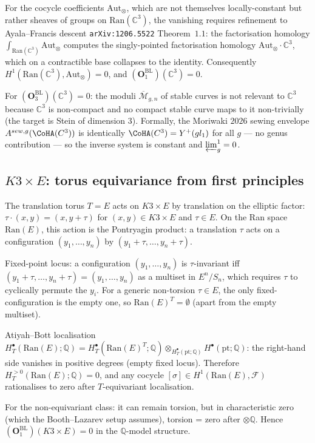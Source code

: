 \documentclass[11pt]{amsart}
\newcommand{\cF}{\mathcal{F}}
\newcommand{\Ran}{\mathrm{Ran}}
\newcommand{\Mbar}{\overline{\mathcal{M}}}
\newcommand{\bC}{\mathbb{C}}
\newcommand{\bQ}{\mathbb{Q}}
\newcommand{\Aut}{\mathrm{Aut}}
\begin{document}
For the cocycle coefficients $\Aut_\otimes$, which are not
themselves locally-constant but rather sheaves of groups on
$\Ran(\bC^3)$, the vanishing requires refinement to Ayala--Francis
descent \texttt{arXiv:1206.5522} Theorem~$1.1$: the factorisation
homology $\int_{\Ran(\bC^3)} \Aut_\otimes$ computes the
singly-pointed factorisation homology $\Aut_\otimes \cdot \bC^3$,
which on a contractible base collapses to the identity.
Consequently $H^1(\Ran(\bC^3), \Aut_\otimes) = 0$, and
$(\mathbf{O}_1^{\mathrm{BL}})(\bC^3) = 0$.

For $(\mathbf{O}_3^{\mathrm{BL}})(\bC^3) = 0$: the moduli
$\Mbar_{g, n}$ of stable curves is not relevant to $\bC^3$ because
$\bC^3$ is non-compact and no compact stable curve
maps to it non-trivially (the target is Stein of dimension $3$).
Formally, the Moriwaki $2026$ sewing envelope
$A^{\mathrm{sew}, g}(\CoHA(\bC^3))$ is identically
$\CoHA(\bC^3) = Y^+(\widehat{\mathfrak{gl}}_1)$ for all $g$ --- no
genus contribution --- so the inverse system is constant and
$\varprojlim^1_g = 0$.

\subsection{$K3 \times E$: torus equivariance from first principles}

The translation torus $T = E$ acts on $K3 \times E$ by translation
on the elliptic factor: $\tau \cdot (x, y) = (x, y + \tau)$ for
$(x, y) \in K3 \times E$ and $\tau \in E$. On the Ran space
$\Ran(E)$, this action is the Pontryagin product: a translation
$\tau$ acts on a configuration $(y_1, \dots, y_n)$ by
$(y_1 + \tau, \dots, y_n + \tau)$.

Fixed-point locus: a configuration $(y_1, \dots, y_n)$ is
$\tau$-invariant iff $(y_1 + \tau, \dots, y_n + \tau) =
(y_1, \dots, y_n)$ as a multiset in $E^n/S_n$, which requires
$\tau$ to cyclically permute the $y_i$. For a generic
non-torsion $\tau \in E$, the only fixed-configuration is the empty
one, so $\Ran(E)^T = \emptyset$ (apart from the empty multiset).

Atiyah--Bott localisation $H^\bullet_T(\Ran(E); \bQ) =
H^\bullet_T(\Ran(E)^T; \bQ) \otimes_{H^\bullet_T(\mathrm{pt}; \bQ)}
H^\bullet(\mathrm{pt}; \bQ)$: the right-hand side vanishes in
positive degrees (empty fixed locus). Therefore
$H^{> 0}_T(\Ran(E); \bQ) = 0$, and any cocycle $[\sigma] \in
H^1(\Ran(E), \cF)$ rationalises to zero after $T$-equivariant
localisation.

For the non-equivariant class: it can remain torsion, but in
characteristic zero (which the Booth--Lazarev setup assumes),
torsion = zero after $\otimes \bQ$. Hence
$(\mathbf{O}_1^{\mathrm{BL}})(K3 \times E) = 0$ in the $\bQ$-model
structure.
\end{document}
